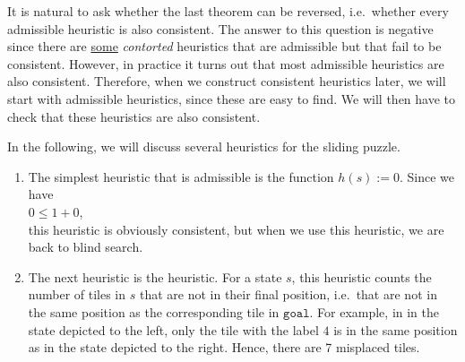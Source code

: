 It is natural to ask whether the last theorem can be reversed, i.e.~whether every admissible heuristic is also
consistent.  The answer to this question is negative since there are
\href{http://web.cs.du.edu/~sturtevant/papers/incnew.pdf}{some} \emph{\color{red}contorted}
heuristics that are admissible but that fail to be consistent.  However, in practice it turns out that most
admissible heuristics are also consistent.  Therefore, when we construct consistent heuristics later, we will
start with admissible heuristics, since these are easy to find.  We will then have to check that these
heuristics are also consistent.

\examples
In the following, we will discuss several heuristics for the sliding puzzle.
\begin{enumerate}
\item The simplest heuristic that is admissible is the function $h(s) := 0$.  Since we have
      \\[0.2cm]
      \hspace*{1.3cm}
      $0 \leq 1 + 0$,
      \\[0.2cm]
      this heuristic is obviously consistent, but when we use this heuristic, we are back to blind search.
\item The next heuristic is the  heuristic.  For a state $s$,
      this heuristic counts the number of tiles in $s$ that are not in their final position, i.e.~that are not
      in the same position as the corresponding tile in $\texttt{goal}$.  For example, in 
      in the state depicted to the left, only the tile with the label $4$ is in the same
      position as in the state depicted to the right.  Hence, there are 7 misplaced tiles.


\end{enumerate}
